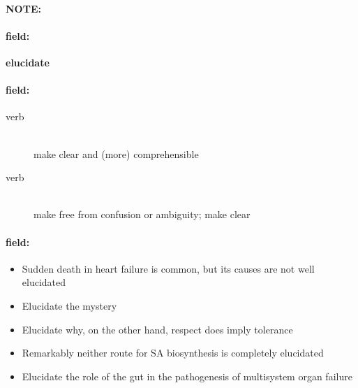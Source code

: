 \documentclass[12pt]{article}
\newenvironment{note}{\paragraph{NOTE:}}{}
\newenvironment{field}{\paragraph{field:}}{}
\begin{document}
\begin{note}
\begin{field}
\textbf{\large elucidate}
\end{field}


\begin{field}
\begin{description}
\item[verb] \hfill \\ 
make clear and (more) comprehensible

\item[verb] \hfill \\ 
make free from confusion or ambiguity; make clear

\end{description}
\end{field}

\begin{field}
\begin{itemize}
\item Sudden death in heart failure is common, but its causes are not well elucidated
\item Elucidate the mystery
\item Elucidate why, on the other hand, respect does imply tolerance
\item Remarkably neither route for SA biosynthesis is completely elucidated
\item Elucidate the role of the gut in the pathogenesis of multisystem organ failure
\end{itemize}
\end{field}
\end{note}
\end{document}
